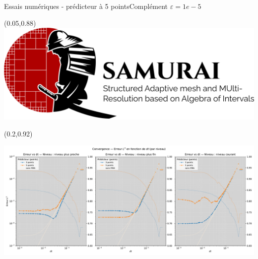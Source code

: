 \begin{frame}{Essais numériques - prédicteur à 5 points}{Complément}
    $\varepsilon = 1e-5$
    \begin{textblock*}{40pt}(0.05\paperwidth,0.88\paperheight)\includegraphics[scale=.03]{medias/2_/1_/light_logo.png}\end{textblock*}
    \begin{textblock*}{40pt}(0.2\paperwidth,0.92\paperheight)
        {\color{black}{+ Ponio}}
    \end{textblock*}
    \includegraphics[width = \textwidth]{medias/3_/error_vs_dt_by_stencil_per_mlf.pdf}
\end{frame}